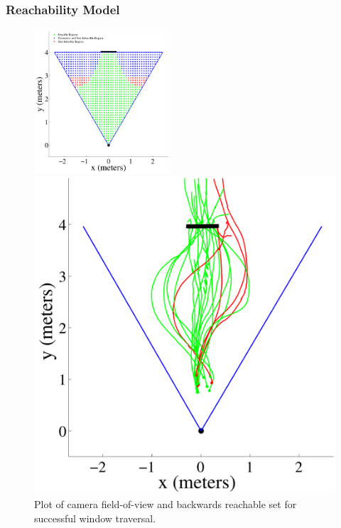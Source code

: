 \documentclass{aamas2013}
\begin{document}
\subsubsection{Reachability Model}
\label{sec:visual_servoing}
\begin{figure}[tb!]

\begin{minipage}{\linewidth}
\centering
\includegraphics[width=0.45\textwidth]{figures/feasible_set.pdf}
\caption{Plot of camera field-of-view and backwards reachable set for successful window traversal.}
\label{fig:feasible_set}
\end{minipage}
\vspace{1em}
\begin{minipage}[b]{0.45\linewidth}
\centering
\includegraphics[width=\textwidth]{figures/flight_paths_feasible.pdf}

\end{minipage}
\end{figure}
\end{document}
